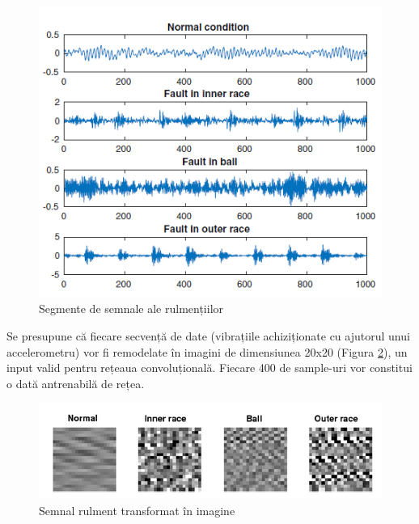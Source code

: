 \documentclass[a4paper,12pt]{report}
\begin{document}
    	\begin{figure}[H]
    		\begin{center}
    			\includegraphics[scale=0.7]{images/bearing_signal.PNG}
    		\end{center}
    		\caption{Segmente de semnale ale rulmențiilor}
    		\label{fig:bearing_signals}
    	\end{figure}
    	
    	Se presupune că fiecare secvență de date (vibrațiile achiziționate cu ajutorul unui accelerometru) vor fi remodelate în imagini de dimensiunea 20x20 (Figura \ref{fig:bearing_image}), un input valid pentru rețeaua convoluțională. Fiecare 400 de sample-uri vor constitui o dată antrenabilă de rețea.
    	
    	\begin{figure}[H]
    		\begin{center}
    			\includegraphics[scale=0.5]{images/image_bearing.PNG}
    		\end{center}
    		\caption{Semnal rulment transformat în imagine}
    		\label{fig:bearing_image}
    	\end{figure}
 	
    	\clearpage
\end{document}
